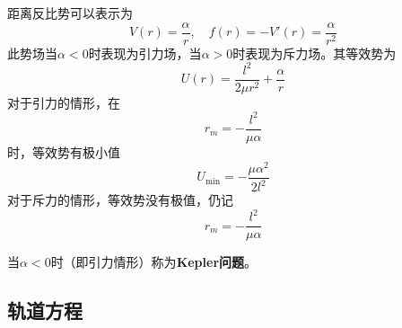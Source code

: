 距离反比势可以表示为
\begin{equation*}
	V(r) = \frac{\alpha}{r},\quad f(r) = -V'(r) = \frac{\alpha}{r^2}
\end{equation*}
此势场当$\alpha<0$时表现为引力场，当$\alpha>0$时表现为斥力场。其等效势为
\begin{equation}
	U(r) = \frac{l^2}{2\mu r^2} + \frac{\alpha}{r}
\end{equation}
对于引力的情形，在
\begin{equation}
	r_m = -\frac{l^2}{\mu \alpha}
\end{equation}
时，等效势有极小值
\begin{equation}
	U_{\mathrm{min}} = -\frac{\mu \alpha^2}{2l^2}
\end{equation}
对于斥力的情形，等效势没有极值，仍记
\begin{equation*}
	r_m = -\frac{l^2}{\mu \alpha}
\end{equation*}

当$\alpha<0$时（即引力情形）称为{\bf Kepler问题}。

\subsection{轨道方程}\label{chapter4:subsection-轨道方程}

